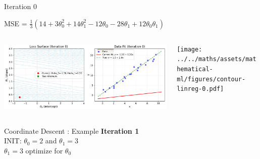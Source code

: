 \documentclass{beamer}
\begin{document}
\begin{frame}{Iteration 0}

MSE = $\frac{1}{3}(14+3\theta_{0}^{2}+14\theta_{1}^{2}-12\theta_{0}-28\theta_{1}+12\theta_{0}\theta_{1})$\\

\begin{columns}
\begin{column}{0.6\textwidth}
\begin{adjustbox}{max totalsize={\textwidth},center}
\includegraphics[width=\textwidth]{../../maths/assets/mathematical-ml/figures/gradient-descent-0.pdf}
\end{adjustbox}

\end{column}
\begin{column}{0.5\textwidth}
\begin{adjustbox}{max totalsize={\textwidth},center}
\texttt{[image: ../../maths/assets/mathematical-ml/figures/contour-linreg-0.pdf]}
\end{adjustbox}
\end{column}
\end{columns}




\end{frame}

\begin{frame}{Coordinate Descent : Example}
\textbf{Iteration 1}\\
\vspace{0.5cm}
INIT: $\theta_{0} = 2$ and  $\theta_{1}  = 3$\\

\vspace{0.5cm}
$\theta_1 = 3$ optimize for $\theta_{0}$\\ 


\end{frame}
\end{document}
